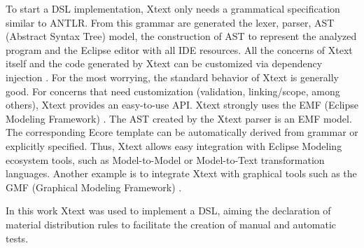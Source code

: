 
To start a DSL implementation, Xtext only needs a grammatical specification similar to ANTLR. From this grammar are generated the lexer, parser, AST (Abstract Syntax Tree) model, the construction of AST to represent the analyzed program and the Eclipse editor with all IDE resources. All the concerns of Xtext itself and the code generated by Xtext can be customized via dependency injection \cite{prasanna2009}. For the most worrying, the standard behavior of Xtext is generally good. For concerns that need customization (validation, linking/scope, among others), Xtext provides an easy-to-use API. Xtext strongly uses the EMF (Eclipse Modeling Framework) \cite{blewitt2013}. The AST created by the Xtext parser is an EMF model. The corresponding Ecore template can be automatically derived from grammar or explicitly specified. Thus, Xtext allows easy integration with Eclipse Modeling ecosystem tools, such as Model-to-Model or Model-to-Text transformation languages. Another example is to integrate Xtext with graphical tools such as the GMF (Graphical Modeling Framework) \cite{eysholdt2010}.


In this work Xtext was used to implement a DSL, aiming the declaration of material distribution rules to facilitate the creation of manual and automatic tests.
